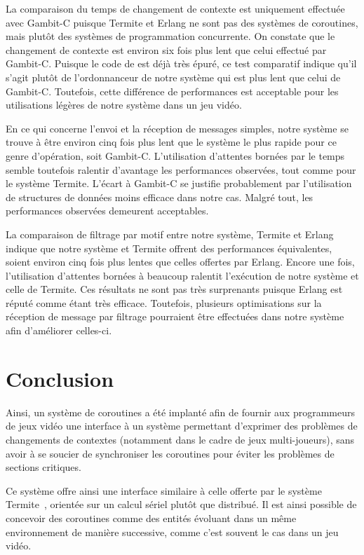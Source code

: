 \documentclass[12pt,twoside,letterpaper,francais]{book}
\newcommand{\scheme}[1]{\selectlanguage{english}{\tt #1}\selectlanguage{french}}
\begin{document}
La comparaison du temps de changement de contexte est uniquement
effectuée avec Gambit-C puisque Termite et Erlang ne sont pas des
systèmes de coroutines, mais plutôt des systèmes de programmation
concurrente. On constate que le changement de contexte est environ six
fois plus lent que celui effectué par Gambit-C. Puisque le code de
\scheme{yield} est déjà très épuré, ce test comparatif indique qu'il
s'agit plutôt de l'ordonnanceur de notre système qui est plus lent que
celui de Gambit-C. Toutefois, cette différence de performances est
acceptable pour les utilisations légères de notre système dans un jeu
vidéo.

En ce qui concerne l'envoi et la réception de messages simples, notre
système se trouve à être environ cinq fois plus lent que le système le
plus rapide pour ce genre d'opération, soit Gambit-C. L'utilisation
d'attentes bornées par le temps semble toutefois ralentir d'avantage
les performances observées, tout comme pour le système Termite.
L'écart à Gambit-C se justifie probablement par l'utilisation de
structures de données moins efficace dans notre cas. Malgré tout, les
performances observées demeurent acceptables.

La comparaison de filtrage par motif entre notre système, Termite et
Erlang indique que notre système et Termite offrent des performances
équivalentes, soient environ cinq fois plus lentes que celles offertes
par Erlang. Encore une fois, l'utilisation d'attentes bornées à
beaucoup ralentit l'exécution de notre système et celle de Termite.
Ces résultats ne sont pas très surprenants puisque Erlang est réputé
comme étant très efficace. Toutefois, plusieurs optimisations sur la
réception de message par filtrage pourraient être effectuées dans
notre système afin d'améliorer celles-ci.


\FloatBarrier
\section{Conclusion}
Ainsi, un système de coroutines a été implanté afin de fournir aux
programmeurs de jeux vidéo une interface à un système permettant
d'exprimer des problèmes de changements de contextes (notamment dans
le cadre de jeux multi-joueurs), sans avoir à se soucier de
synchroniser les coroutines pour éviter les problèmes de sections
critiques.

Ce système offre ainsi une interface similaire à celle offerte par le
système Termite~\cite{Termite_paper}, orientée sur un calcul sériel
plutôt que distribué. Il est ainsi possible de concevoir des
coroutines comme des entités évoluant dans un même environnement de
manière successive, comme c'est souvent le cas dans un jeu vidéo.
\end{document}

